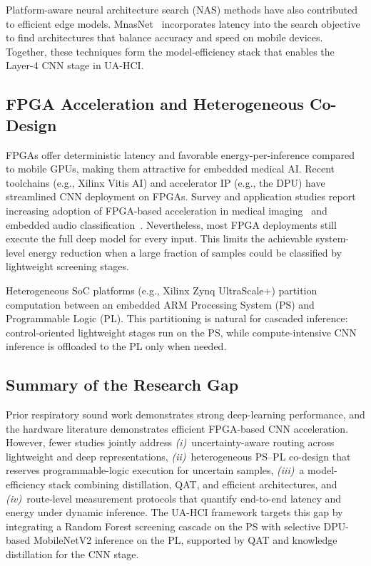 Platform-aware neural architecture search (NAS) methods have also contributed to efficient edge models. MnasNet~\cite{mnasnet2019} incorporates latency into the search objective to find architectures that balance accuracy and speed on mobile devices. Together, these techniques form the model-efficiency stack that enables the Layer-4 CNN stage in UA-HCI.

\subsection{FPGA Acceleration and Heterogeneous Co-Design}
FPGAs offer deterministic latency and favorable energy-per-inference compared to mobile GPUs, making them attractive for embedded medical AI. Recent toolchains (e.g., Xilinx Vitis AI) and accelerator IP (e.g., the DPU) have streamlined CNN deployment on FPGAs. Survey and application studies report increasing adoption of FPGA-based acceleration in medical imaging~\cite{zhu2023} and embedded audio classification~\cite{fazilat2023}. Nevertheless, most FPGA deployments still execute the full deep model for every input. This limits the achievable system-level energy reduction when a large fraction of samples could be classified by lightweight screening stages.

Heterogeneous SoC platforms (e.g., Xilinx Zynq UltraScale+) partition computation between an embedded ARM Processing System (PS) and Programmable Logic (PL). This partitioning is natural for cascaded inference: control-oriented lightweight stages run on the PS, while compute-intensive CNN inference is offloaded to the PL only when needed.

\subsection{Summary of the Research Gap}
Prior respiratory sound work demonstrates strong deep-learning performance, and the hardware literature demonstrates efficient FPGA-based CNN acceleration. However, fewer studies jointly address \emph{(i)}~uncertainty-aware routing across lightweight and deep representations, \emph{(ii)}~heterogeneous PS--PL co-design that reserves programmable-logic execution for uncertain samples, \emph{(iii)}~a model-efficiency stack combining distillation, QAT, and efficient architectures, and \emph{(iv)}~route-level measurement protocols that quantify end-to-end latency and energy under dynamic inference. The UA-HCI framework targets this gap by integrating a Random Forest screening cascade on the PS with selective DPU-based MobileNetV2 inference on the PL, supported by QAT and knowledge distillation for the CNN stage.